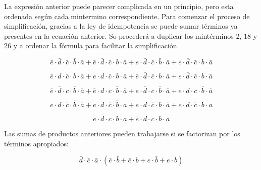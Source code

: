 La expresión anterior puede parecer complicada en un principio, pero esta ordenada según cada mintermino correspondiente. Para comenzar el proceso de simplificación, gracias a la ley de idempotencia se puede sumar términos ya presentes en la ecuación anterior. So procederá a duplicar los mintérminos 2, 18 y 26 y a ordenar la fórmula para facilitar la simplificación. 

\begin{equation}
\bar{e} \cdot \bar{d} \cdot \bar{c} \cdot \bar{b} \cdot \bar{a} +  %
\bar{e} \cdot \bar{d} \cdot \bar{c} \cdot b \cdot \bar{a} +        %
e \cdot \bar{d} \cdot \bar{c} \cdot \bar{b} \cdot \bar{a} +    	  %
e \cdot \bar{d} \cdot \bar{c} \cdot b \cdot \bar{a}  	          %
\end{equation}

\begin{equation}
\bar{e} \cdot d \cdot \bar{c} \cdot b \cdot \bar{a} + 		      %
e \cdot d \cdot \bar{c} \cdot b \cdot \bar{a} + 	                  %
\bar{e} \cdot \bar{d} \cdot \bar{c} \cdot b \cdot \bar{a} +        %
e \cdot \bar{d} \cdot \bar{c} \cdot b \cdot \bar{a}  	          %
\end{equation}

\begin{equation}
\bar{e} 	\cdot \bar{d} \cdot c \cdot \bar{b} \cdot \bar{a} +	      %
\bar{e} \cdot d \cdot c \cdot \bar{b} \cdot \bar{a} + 			  %
e \cdot \bar{d} \cdot c \cdot \bar{b} \cdot \bar{a} + 		      %
e \cdot d \cdot c \cdot \bar{b} \cdot \bar{a}                      %
\end{equation}

\begin{equation}
e \cdot d \cdot \bar{c} \cdot \bar{b} \cdot \bar{a} +              %
e \cdot d \cdot \bar{c} \cdot \bar{b} \cdot a +                    %
e \cdot d \cdot \bar{c} \cdot b \cdot \bar{a} + 	                  %
e \cdot d \cdot \bar{c} \cdot b \cdot a                           %
\end{equation}

\begin{equation}
e \cdot \bar{d} \cdot c \cdot b \cdot a +                          %
\bar{e} \cdot \bar{d} \cdot c \cdot b \cdot a  			          %
\end{equation}

Las sumas de productos anteriores pueden trabajarse si se factorizan por los términos apropiados:

\begin{equation}\label{eq:minterm_0_2_16_18}
\bar{d} \cdot \bar{c} \cdot \bar{a} \cdot (\bar{e} \cdot \bar{b} + \bar{e} \cdot b + e \cdot \bar{b} + e \cdot b)
\end{equation}

